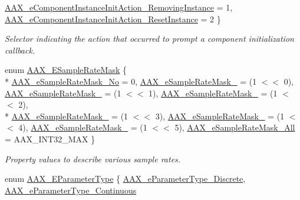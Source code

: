 \begin{DoxyCompactItemize}
\hyperlink{a00206_aff5646376a3c93f032cf2400e0885023a3613e80b9d38bf17ac3156c2ac93c829}{A\+A\+X\+\_\+e\+Component\+Instance\+Init\+Action\+\_\+\+Removing\+Instance} = 1, 
\hyperlink{a00206_aff5646376a3c93f032cf2400e0885023a8315b2fe108358246ecbef9e83262370}{A\+A\+X\+\_\+e\+Component\+Instance\+Init\+Action\+\_\+\+Reset\+Instance} = 2
 \}
\begin{DoxyCompactList}\small\item\em Selector indicating the action that occurred to prompt a component initialization callback. \end{DoxyCompactList}\item 
enum \hyperlink{a00206_a5bb98259de21d2c4d04a2d6010d757c7}{A\+A\+X\+\_\+\+E\+Sample\+Rate\+Mask} \{ \\*
\hyperlink{a00206_a5bb98259de21d2c4d04a2d6010d757c7a458fc436e77f902b77b7b983a851219f}{A\+A\+X\+\_\+e\+Sample\+Rate\+Mask\+\_\+\+No} = 0, 
\hyperlink{a00206_a5bb98259de21d2c4d04a2d6010d757c7a8106bec62e39f1071a6a931cf4e5ec4c}{A\+A\+X\+\_\+e\+Sample\+Rate\+Mask\+\_} = (1 $<$$<$ 0), 
\hyperlink{a00206_a5bb98259de21d2c4d04a2d6010d757c7ab2310b7f1b05876a9f8770744379428b}{A\+A\+X\+\_\+e\+Sample\+Rate\+Mask\+\_} = (1 $<$$<$ 1), 
\hyperlink{a00206_a5bb98259de21d2c4d04a2d6010d757c7abf628ee0d12c9846bb38d225095c2d24}{A\+A\+X\+\_\+e\+Sample\+Rate\+Mask\+\_} = (1 $<$$<$ 2), 
\\*
\hyperlink{a00206_a5bb98259de21d2c4d04a2d6010d757c7ade1aaf791255ff44775c7f5a1415c3dc}{A\+A\+X\+\_\+e\+Sample\+Rate\+Mask\+\_} = (1 $<$$<$ 3), 
\hyperlink{a00206_a5bb98259de21d2c4d04a2d6010d757c7a665a9d9380094ea8d6a4236bd3bd698a}{A\+A\+X\+\_\+e\+Sample\+Rate\+Mask\+\_} = (1 $<$$<$ 4), 
\hyperlink{a00206_a5bb98259de21d2c4d04a2d6010d757c7ad15326f9435869902b8dadefb63c8b06}{A\+A\+X\+\_\+e\+Sample\+Rate\+Mask\+\_} = (1 $<$$<$ 5), 
\hyperlink{a00206_a5bb98259de21d2c4d04a2d6010d757c7a4cb483e6087c4bf1118da39319269fd0}{A\+A\+X\+\_\+e\+Sample\+Rate\+Mask\+\_\+\+All} = A\+A\+X\+\_\+\+I\+N\+T32\+\_\+\+M\+A\+X
 \}
\begin{DoxyCompactList}\small\item\em Property values to describe various sample rates. \end{DoxyCompactList}\item 
enum \hyperlink{a00206_a4cd0f189daa9a60cf36883c56344bb2e}{A\+A\+X\+\_\+\+E\+Parameter\+Type} \{ \hyperlink{a00206_a4cd0f189daa9a60cf36883c56344bb2ea2a3c9939ef1fa8b8f729152c35c42740}{A\+A\+X\+\_\+e\+Parameter\+Type\+\_\+\+Discrete}, 
\hyperlink{a00206_a4cd0f189daa9a60cf36883c56344bb2eade82e7d1b5012a76837b70c1a9b92168}{A\+A\+X\+\_\+e\+Parameter\+Type\+\_\+\+Continuous}

\end{DoxyCompactItemize}
